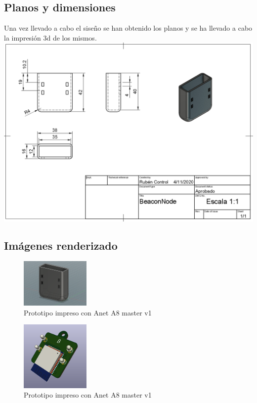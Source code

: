 \documentclass[a4paper ,12pt, onecolumn]{article}
\begin{document}
    \subsection{Planos y dimensiones}
        Una vez llevado a cabo el siseño se han obtenido los planos y se ha llevado a cabo la impresión 3d de los mismos.
        \includegraphics[scale=0.25]{../model_beacon.PNG}
    \subsection{Imágenes renderizado}
    \begin{center}
        \begin{center}
            \begin{figure}[h]
                \centering
                \includegraphics[width=0.3\textwidth]{../mechanical_beacon.PNG}
                \caption{Prototipo impreso con Anet A8 master v1}
                \label{fig:mesh1}
            \end{figure}
        \end{center}
        \begin{center}
            \begin{figure}[h]
                \centering
                \includegraphics[width=0.3\textwidth]{../emiter_1.PNG}
                \caption{Prototipo impreso con Anet A8 master v1}
                \label{fig:mesh1}
            \end{figure}
        \end{center}
    \end{center}
\end{document}
